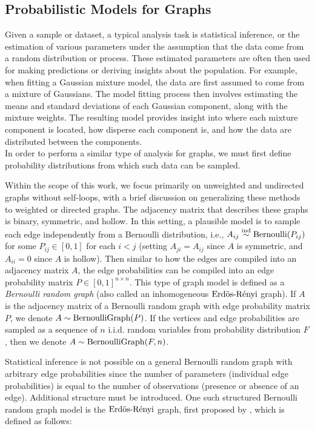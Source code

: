 \documentclass[
  12pt,
]{article}
\theoremstyle{definition}
\theoremstyle{definition}
\theoremstyle{definition}
\theoremstyle{definition}
\theoremstyle{remark}
\begin{document}
\hypertarget{probabilistic-models-for-graphs}{%
\subsection{Probabilistic Models for Graphs}\label{probabilistic-models-for-graphs}}

Given a sample or dataset, a typical analysis task is statistical inference, or the estimation of various parameters under the assumption that the data come from a random distribution or process.
These estimated parameters are often then used for making predictions or deriving insights about the population.
For example, when fitting a Gaussian mixture model, the data are first assumed to come from a mixture of Gaussians.
The model fitting process then involves estimating the means and standard deviations of each Gaussian component, along with the mixture weights.
The resulting model provides insight into where each mixture component is located, how disperse each component is, and how the data are distributed between the components.\\
In order to perform a similar type of analysis for graphs, we must first define probability distributions from which such data can be sampled.

Within the scope of this work, we focus primarily on unweighted and undirected graphs without self-loops, with a brief discussion on generalizing these methods to weighted or directed graphs.
The adjacency matrix that describes these graphs is binary, symmetric, and hollow.
In this setting, a plausible model is to sample each edge independently from a Bernoulli distribution, i.e., \(A_{ij} \stackrel{\mathrm{ind}}{\sim} \mathrm{Bernoulli}(P_{ij})\) for some \(P_{ij} \in [0, 1]\) for each \(i < j\) (setting \(A_{ji} = A_{ij}\) since \(A\) is symmetric, and \(A_{ii} = 0\) since \(A\) is hollow).
Then similar to how the edges are compiled into an adjacency matrix \(A\), the edge probabilities can be compiled into an edge probability matrix \(P \in [0, 1]^{n \times n}\).
This type of graph model is defined as a \emph{Bernoulli random graph} (also called an inhomogeneous \(\text{Erd\"{o}s-R\'{e}nyi}\) graph).
If \(A\) is the adjacency matrix of a Bernoulli random graph with edge probability matrix \(P\), we denote \(A \sim \mathrm{BernoulliGraph}(P)\).
If the vertices and edge probabilities are sampled as a sequence of \(n\) i.i.d. random variables from probability distribution \(F\), then we denote \(A \sim \mathrm{BernoulliGraph}(F, n)\).

Statistical inference is not possible on a general Bernoulli random graph with arbitrary edge probabilities since the number of parameters (individual edge probabilities) is equal to the number of observations (presence or absence of an edge).
Additional structure must be introduced.
One such structured Bernoulli random graph model is the \(\text{Erd\"{o}s-R\'{e}nyi}\) graph, first proposed by \cite{Gilbert:1959}, which is defined as follows:
\end{document}
